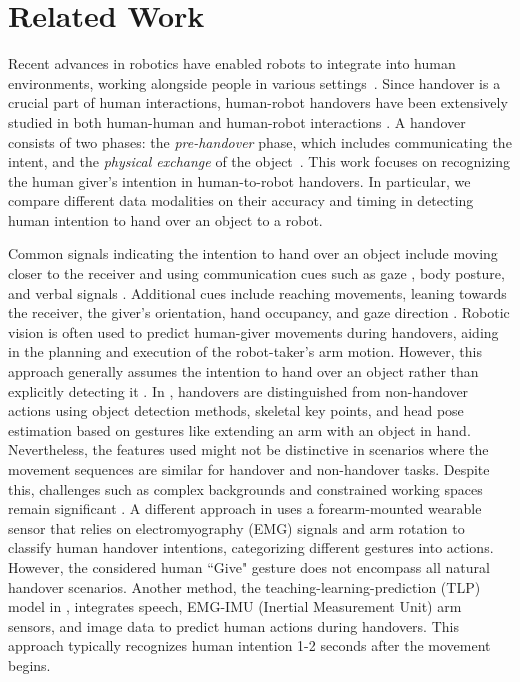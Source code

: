 \section{Related Work}
Recent advances in robotics have enabled robots to integrate into human environments, working alongside people in various settings~\cite{survey_review_2022_object_handovers}. Since handover is a crucial part of human interactions, human-robot handovers have been extensively studied in both human-human \cite{human_human_to_human_robot_study_Controzzi,datasetmultimodalhandovers} and human-robot interactions \cite{survey_review_2022_object_handovers,human_human_to_human_robot_study_Controzzi,When_where_how_human-human_studyStrabala}. A handover consists of two phases: the \emph{pre-handover} phase, which includes communicating the intent, and the \emph{physical exchange} of the object~\cite{survey_review_2022_object_handovers}. This work focuses on recognizing the human giver's intention in human-to-robot handovers. In particular, we compare different data modalities on their accuracy and timing in detecting human intention to hand over an object to a robot.

Common signals indicating the intention to hand over an object include moving closer to the receiver \cite{human_dog_behaviors_in_handovers} and using communication cues such as gaze \cite{shared_attention_gaze_hanover_timing_2014}, body posture, and verbal signals \cite{survey_review_2022_object_handovers}. Additional cues include reaching movements, leaning towards the receiver, the giver's orientation, hand occupancy, and gaze direction \cite{comm_intent_before_HRC_strabala2012}. Robotic vision is often used to predict human-giver movements during handovers, aiding in the planning and execution of the robot-taker's arm motion. However, this approach generally assumes the intention to hand over an object rather than explicitly detecting it \cite{survey_review_2022_object_handovers}. In \cite{basic_CV_for_intention_kwan2020handover}, handovers are distinguished from non-handover actions using object detection methods, skeletal key points, and head pose estimation based on gestures like extending an arm with an object in hand. Nevertheless, the features used might not be distinctive in scenarios where the movement sequences are similar for handover and non-handover tasks. Despite this, challenges such as complex backgrounds and constrained working spaces remain significant \cite{intention_multimodal_Wang2022}. A different approach in \cite{handover_with_wearable_EMG_Wang2019} uses a forearm-mounted wearable sensor that relies on electromyography (EMG) signals and arm rotation to classify human handover intentions, categorizing different gestures into actions. However, the considered human ``Give" gesture does not encompass all natural handover scenarios. Another method, the teaching-learning-prediction (TLP) model in \cite{intention_multimodal_Wang2022}, integrates speech, EMG-IMU (Inertial Measurement Unit) arm sensors, and image data to predict human actions during handovers. This approach typically recognizes human intention 1-2 seconds after the movement begins.

